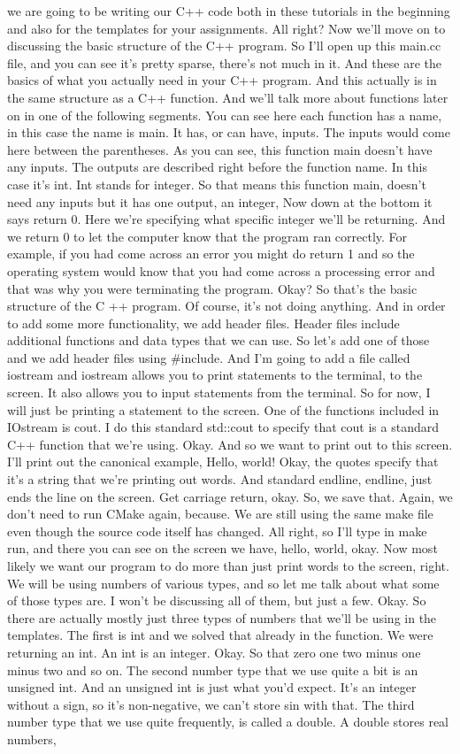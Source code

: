 \documentclass[10pt]{article}
\begin{document}
we are going to be writing our C++ code both in these tutorials in the beginning and also for the templates for your assignments. All right? Now we'll move on to discussing the basic structure of the C++ program. So I'll open up this main.cc file, and you can see it's pretty sparse, there's not much in it. And these are the basics of what you actually need in your C++ program. And this actually is in the same structure as a C++ function. And we'll talk more about functions later on in one of the following segments. You can see here each function has a name, in this case the name is main. It has, or can have, inputs. The inputs would come here between the parentheses. As you can see, this function main doesn't have any inputs. The outputs are described right before the function name. In this case it's int. Int stands for integer. So that means this function main, doesn't need any inputs but it has one output, an integer, Now down at the bottom it says return 0. Here we're specifying what specific integer we'll be returning. And we return 0 to let the computer know that the program ran correctly. For example, if you had come across an error you might do return 1 and so the operating system would know that you had come across a processing error and that was why you were terminating the program. Okay? So that's the basic structure of the C ++ program. Of course, it's not doing anything. And in order to add some more functionality, we add header files. Header files include additional functions and data types that we can use. So let's add one of those and we add header files using \#include. And I'm going to add a file called iostream and iostream allows you to print statements to the terminal, to the screen. It also allows you to input statements from the terminal. So for now, I will just be printing a statement to the screen. One of the functions included in IOstream is cout. I do this standard std::cout to specify that cout is a standard C++ function that we're using. Okay. And so we want to print out to this screen. I'll print out the canonical example, Hello, world! Okay, the quotes specify that it's a string that we're printing out words. And standard endline, endline, just ends the line on the screen. Get carriage return, okay. So, we save that. Again, we don't need to run CMake again, because. We are still using the same make file even though the source code itself has changed. All right, so I'll type in make run, and there you can see on the screen we have, hello, world, okay. Now most likely we want our program to do more than just print words to the screen, right. We will be using numbers of various types, and so let me talk about what some of those types are. I won't be discussing all of them, but just a few. Okay. So there are actually mostly just three types of numbers that we'll be using in the templates. The first is int and we solved that already in the function. We were returning an int. An int is an integer. Okay. So that zero one two minus one minus two and so on. The second number type that we use quite a bit is an unsigned int. And an unsigned int is just what you'd expect. It's an integer without a sign, so it's non-negative, we can't store sin with that. The third number type that we use quite frequently, is called a double. A double stores real numbers, 
\end{document}
